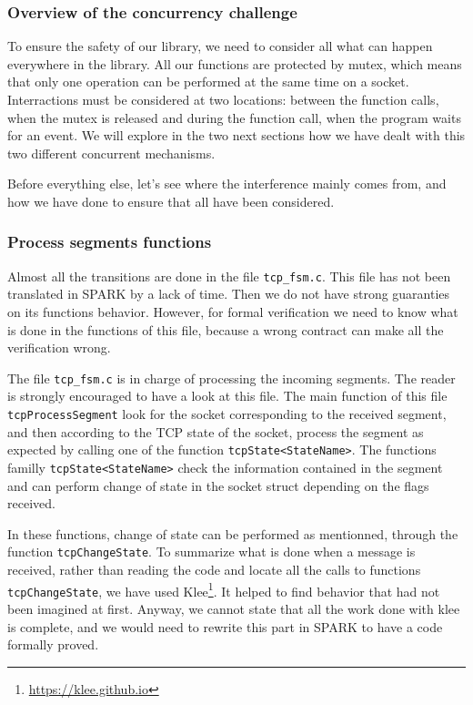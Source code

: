\documentclass[a4paper, 10pt]{article}
\begin{document}
    \subsubsection{Overview of the concurrency challenge}

    To ensure the safety of our library, we need to consider all what can happen everywhere in
    the library. All our functions are protected by mutex, which means that only one operation
    can be performed at the same time on a socket. Interractions must be considered at two
    locations: between the function calls, when the mutex is released and during the function
    call, when the program waits for an event. We will explore in the two next sections how we
    have dealt with this two different concurrent mechanisms.

    Before everything else, let's see where the interference mainly comes from, and how we have
    done to ensure that all have been considered.

    \subsubsection{Process segments functions}

    Almost all the transitions are done in the file \texttt{tcp\_fsm.c}. This file has not been
    translated in SPARK by a lack of time. Then we do not have strong guaranties on its functions
    behavior. However, for formal verification we need to know what is done in the functions of
    this file, because a wrong contract can make all the verification wrong.

    The file \texttt{tcp\_fsm.c} is in charge of processing the incoming segments. The reader is
    strongly encouraged to have a look at this file. The main function of this file
    \texttt{tcpProcessSegment} look for the socket corresponding to the received segment, and then
    according to the TCP state of the socket, process the segment as expected by calling one of
    the function \texttt{tcpState<StateName>}. The functions familly \texttt{tcpState<StateName>}
    check the information contained in the segment and can perform change of state in the socket
    struct depending on the flags received.

    In these functions, change of state can be performed as mentionned, through the function
    \texttt{tcpChangeState}. To summarize what is done when a message is received, rather than
    reading the code and locate all the calls to functions \texttt{tcpChangeState}, we have used
    Klee\footnote{\url{https://klee.github.io}}. It helped to find behavior that had not been
    imagined at first. Anyway, we cannot state that all the work done with klee is complete, and
    we would need to rewrite this part in SPARK to have a code formally proved.
\end{document}
